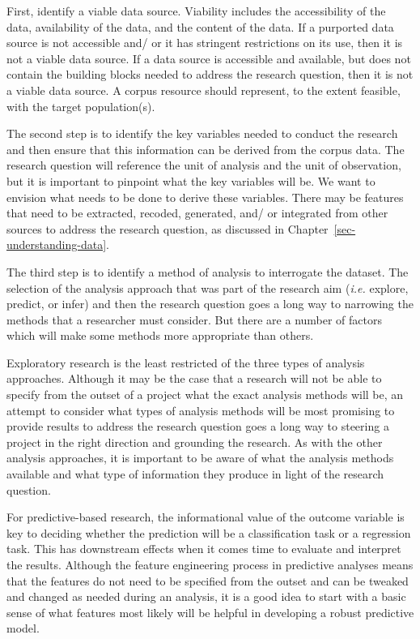 \documentclass[
  letterpaper,
  DIV=11,
  numbers=noendperiod]{scrreprt}
\theoremstyle{definition}
\theoremstyle{remark}
\begin{document}
First, identify a viable data source. Viability includes the
accessibility of the data, availability of the data, and the content of
the data. If a purported data source is not accessible and/ or it has
stringent restrictions on its use, then it is not a viable data source.
If a data source is accessible and available, but does not contain the
building blocks needed to address the research question, then it is not
a viable data source. A corpus resource should represent, to the extent
feasible, with the target population(s).

The second step is to identify the key variables needed to conduct the
research and then ensure that this information can be derived from the
corpus data. The research question will reference the unit of analysis
and the unit of observation, but it is important to pinpoint what the
key variables will be. We want to envision what needs to be done to
derive these variables. There may be features that need to be extracted,
recoded, generated, and/ or integrated from other sources to address the
research question, as discussed in Chapter~\ref{sec-understanding-data}.

The third step is to identify a method of analysis to interrogate the
dataset. The selection of the analysis approach that was part of the
research aim (\emph{i.e.} explore, predict, or infer) and then the
research question goes a long way to narrowing the methods that a
researcher must consider. But there are a number of factors which will
make some methods more appropriate than others.

Exploratory research is the least restricted of the three types of
analysis approaches. Although it may be the case that a research will
not be able to specify from the outset of a project what the exact
analysis methods will be, an attempt to consider what types of analysis
methods will be most promising to provide results to address the
research question goes a long way to steering a project in the right
direction and grounding the research. As with the other analysis
approaches, it is important to be aware of what the analysis methods
available and what type of information they produce in light of the
research question.

For predictive-based research, the informational value of the outcome
variable is key to deciding whether the prediction will be a
classification task or a regression task. This has downstream effects
when it comes time to evaluate and interpret the results. Although the
feature engineering process in predictive analyses means that the
features do not need to be specified from the outset and can be tweaked
and changed as needed during an analysis, it is a good idea to start
with a basic sense of what features most likely will be helpful in
developing a robust predictive model.
\end{document}
